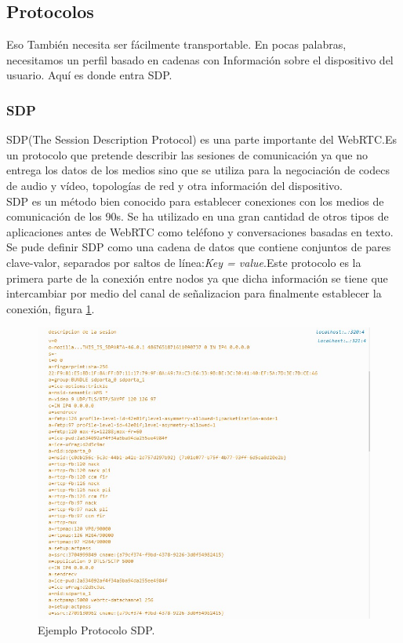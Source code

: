 \subsection{Protocolos}
Eso También necesita ser fácilmente transportable. En pocas palabras, necesitamos un perfil basado en cadenas con
Información sobre el dispositivo del usuario. Aquí es donde entra SDP.
\subsubsection*{SDP}
SDP(The Session Description Protocol) es una parte importante del WebRTC.Es un protocolo que pretende describir las sesiones de comunicación ya que no entrega los datos de los medios sino que se utiliza para la negociación de codecs de audio y vídeo, topologías de red y otra información del dispositivo.
\\SDP es un método bien conocido para establecer conexiones con los medios de comunicación de los 90s. Se ha utilizado en una gran cantidad de otros tipos de aplicaciones antes de WebRTC como teléfono y conversaciones basadas en texto.
\\Se pude definir SDP como una cadena de datos que contiene conjuntos de pares clave-valor, separados por saltos de línea:\textit{Key = value}.Este protocolo es la primera parte de la conexión entre nodos ya que dicha información se tiene que intercambiar por medio del canal de señalizacion para finalmente establecer la conexión, figura \ref{fig:DescripcionSDP}.
\begin{figure}[!h]
\begin{center}
   \includegraphics[width=0.5\linewidth]{Figures/DescripcionSDP}
	\decoRule
	\caption[Ejemplo Protocolo SDP]{Ejemplo Protocolo SDP.}
\label{fig:DescripcionSDP}
\end{center}
\end{figure}
